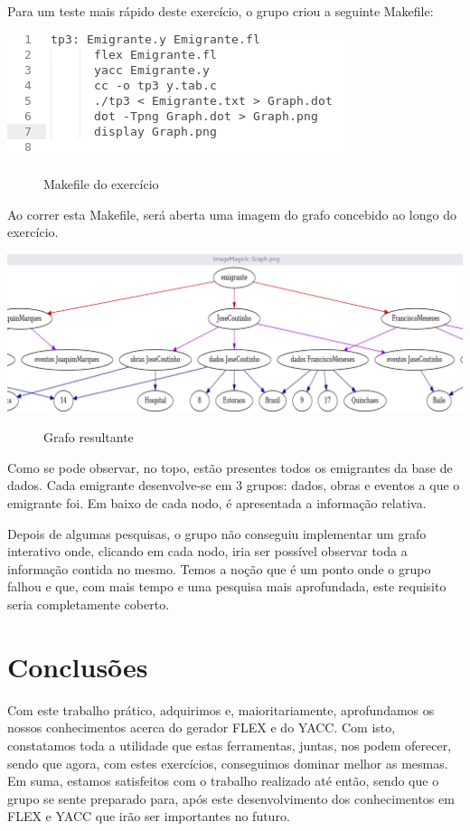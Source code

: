 \documentclass[a4paper]{article}
\begin{document}
Para um teste mais rápido deste exercício, o grupo criou a seguinte Makefile:

\begin{center}
	\includegraphics{makefile}
	\begin{figure}[!ht]
	\caption{Makefile do exercício}
	\end{figure}
\end{center}

Ao correr esta Makefile, será aberta uma imagem do grafo concebido ao longo do exercício.

\begin{center}
	\includegraphics[scale=0.35]{grafo}
	\begin{figure}[!ht]
	\caption{Grafo resultante}
	\end{figure}
\end{center}

Como se pode observar, no topo, estão presentes todos os emigrantes da base de dados.
Cada emigrante desenvolve-se em 3 grupos: dados, obras e eventos a que o emigrante foi.
Em baixo de cada nodo, é apresentada a informação relativa.

Depois de algumas pesquisas, o grupo não conseguiu implementar um grafo interativo onde, clicando em cada nodo, iria ser possível observar toda a informação contida no mesmo. Temos a noção que é um ponto onde o grupo falhou e que, com mais tempo e uma pesquisa mais aprofundada, este requisito seria completamente coberto.

\vspace{100px}
\section{Conclusões}
\label{sec:conclusao}

Com este trabalho prático, adquirimos e, maioritariamente, aprofundamos os nossos conhecimentos acerca do gerador FLEX e do YACC. Com isto, constatamos toda a utilidade que estas ferramentas, juntas, nos podem oferecer, sendo que agora, com estes exercícios, conseguimos dominar melhor as mesmas.
Em suma, estamos satisfeitos com o trabalho realizado até então, sendo que o grupo se sente preparado para, após este desenvolvimento dos conhecimentos em FLEX e YACC que irão ser importantes no futuro.
\end{document}
